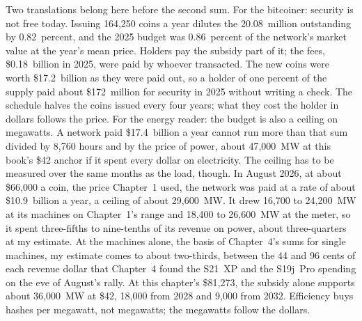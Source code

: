 Two translations belong here before the second sum. For the bitcoiner: security is not free today. Issuing 164,250 coins a year dilutes the 20.08~million outstanding by 0.82~percent, and the 2025 budget was 0.86~percent of the network's market value at the year's mean price. Holders pay the subsidy part of it; the fees, \$0.18~billion in 2025, were paid by whoever transacted. The new coins were worth \$17.2~billion as they were paid out, so a holder of one percent of the supply paid about \$172~million for security in 2025 without writing a check. The schedule halves the coins issued every four years; what they cost the holder in dollars follows the price. %
For the energy reader: the budget is also a ceiling on megawatts. A network paid \$17.4~billion a year cannot run more than that sum divided by 8,760 hours and by the price of power, about 47,000~MW at this book's \$42 anchor if it spent every dollar on electricity. The ceiling has to be measured over the same months as the load, though. In August 2026, at about \$66,000 a coin, the price Chapter~1 used, the network was paid at a rate of about \$10.9~billion a year, a ceiling of about 29,600~MW. It drew 16,700 to 24,200~MW at its machines on Chapter~1's range and 18,400 to 26,600~MW at the meter, so it spent three-fifths to nine-tenths of its revenue on power, about three-quarters at my estimate. At the machines alone, the basis of Chapter~4's sums for single machines, my estimate comes to about two-thirds, between the 44 and 96 cents of each revenue dollar that Chapter~4 found the S21~XP and the S19j~Pro spending on the eve of August's rally. At this chapter's \$81,273, the subsidy alone supports about 36,000~MW at \$42, 18,000 from 2028 and 9,000 from 2032. Efficiency buys hashes per megawatt, not megawatts; the megawatts follow the dollars. %
